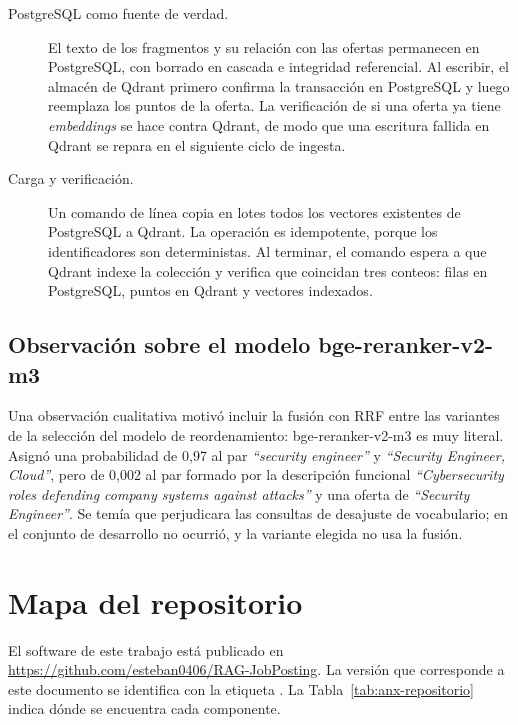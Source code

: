 \begin{description}
    \item[PostgreSQL como fuente de verdad.] El texto de los fragmentos y su relación con las ofertas permanecen en PostgreSQL, con borrado en cascada e integridad referencial. Al escribir, el almacén de Qdrant primero confirma la transacción en PostgreSQL y luego reemplaza los puntos de la oferta. La verificación de si una oferta ya tiene \textit{embeddings} se hace contra Qdrant, de modo que una escritura fallida en Qdrant se repara en el siguiente ciclo de ingesta.
    \item[Carga y verificación.] Un comando de línea copia en lotes todos los vectores existentes de PostgreSQL a Qdrant. La operación es idempotente, porque los identificadores son deterministas. Al terminar, el comando espera a que Qdrant indexe la colección y verifica que coincidan tres conteos: filas en PostgreSQL, puntos en Qdrant y vectores indexados.
\end{description}

\section{Observación sobre el modelo bge-reranker-v2-m3}

Una observación cualitativa motivó incluir la fusión con RRF entre las variantes de la selección del modelo de reordenamiento: bge-reranker-v2-m3 es muy literal. Asignó una probabilidad de 0,97 al par \textit{\enquote{security engineer}} y \textit{\enquote{Security Engineer, Cloud}}, pero de 0,002 al par formado por la descripción funcional \textit{\enquote{Cybersecurity roles defending company systems against attacks}} y una oferta de \textit{\enquote{Security Engineer}}. Se temía que perjudicara las consultas de desajuste de vocabulario; en el conjunto de desarrollo no ocurrió, y la variante elegida no usa la fusión.

\chapter{Mapa del repositorio}
\label{anx:repositorio}

El software de este trabajo está publicado en \url{https://github.com/esteban0406/RAG-JobPosting}. La versión que corresponde a este documento se identifica con la etiqueta . La Tabla~\ref{tab:anx-repositorio} indica dónde se encuentra cada componente.

